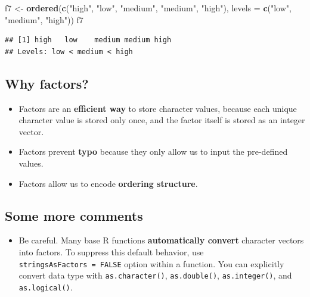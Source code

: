\documentclass[]{book}
\newenvironment{Shaded}{\begin{snugshade}}{\end{snugshade}}
\newcommand{\DataTypeTok}[1]{\textcolor[rgb]{0.13,0.29,0.53}{#1}}
\newcommand{\KeywordTok}[1]{\textcolor[rgb]{0.13,0.29,0.53}{\textbf{#1}}}
\newcommand{\NormalTok}[1]{#1}
\newcommand{\StringTok}[1]{\textcolor[rgb]{0.31,0.60,0.02}{#1}}
\providecommand{\tightlist}{%
  \setlength{\itemsep}{0pt}\setlength{\parskip}{0pt}}
\begin{document}
\begin{Shaded}
\begin{Highlighting}[]
\NormalTok{f7 <-}\StringTok{ }\KeywordTok{ordered}\NormalTok{(}\KeywordTok{c}\NormalTok{(}\StringTok{"high"}\NormalTok{, }\StringTok{"low"}\NormalTok{, }\StringTok{"medium"}\NormalTok{, }\StringTok{"medium"}\NormalTok{, }\StringTok{"high"}\NormalTok{), }\DataTypeTok{levels =} \KeywordTok{c}\NormalTok{(}\StringTok{"low"}\NormalTok{, }\StringTok{"medium"}\NormalTok{, }\StringTok{"high"}\NormalTok{))}
\NormalTok{f7}
\end{Highlighting}
\end{Shaded}

\begin{verbatim}
## [1] high   low    medium medium high  
## Levels: low < medium < high
\end{verbatim}

\hypertarget{why-factors}{%
\subsection{Why factors?}\label{why-factors}}

\begin{itemize}
\tightlist
\item
  Factors are an \textbf{efficient way} to store character values, because each unique character value is stored only once, and the factor itself is stored as an integer vector.
\item
  Factors prevent \textbf{typo} because they only allow us to input the pre-defined values.
\item
  Factors allow us to encode \textbf{ordering structure}.
\end{itemize}

\hypertarget{some-more-comments}{%
\subsection{Some more comments}\label{some-more-comments}}

\begin{itemize}
\tightlist
\item
  Be careful. Many base R functions \textbf{automatically convert} character vectors into factors. To suppress this default behavior, use \texttt{stringsAsFactors\ =\ FALSE} option within a function. You can explicitly convert data type with \texttt{as.character()}, \texttt{as.double()}, \texttt{as.integer()}, and \texttt{as.logical()}.
\end{itemize}
\end{document}
